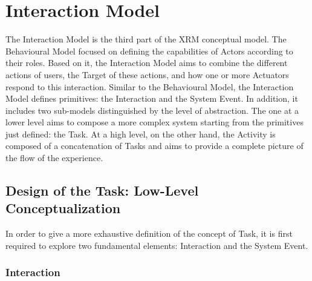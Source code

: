 \section{Interaction Model}
\label{sec:conceptual-interaction}

The Interaction Model is the third part of the XRM conceptual model. The Behavioural Model focused on defining the capabilities of Actors according to their roles.  Based on it, the Interaction Model aims to combine the different actions of users, the Target of these actions, and how one or more Actuators respond to this interaction.
Similar to the Behavioural Model, the Interaction Model defines primitives: the Interaction and the System Event.
In addition, it includes two sub-models distinguished by the level of abstraction. The one at a lower level aims to compose a more complex system starting from the primitives just defined: the Task. At a high level, on the other hand, the Activity is composed of a concatenation of Tasks and aims to provide a complete picture of the flow of the experience. 

\subsection*{Design of the Task: Low-Level Conceptualization}

In order to give a more exhaustive definition of the concept of Task, it is first required to explore two fundamental elements: Interaction and the System Event.

\subsubsection*{Interaction}

